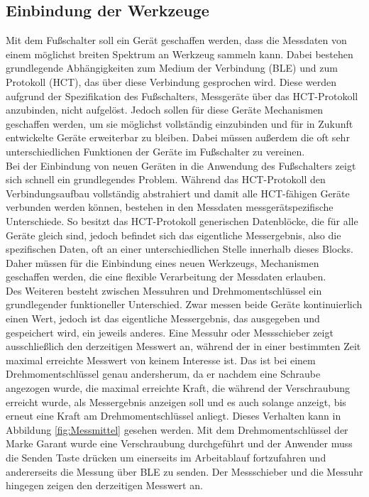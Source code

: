 \subsection{Einbindung der Werkzeuge}
Mit dem Fußschalter soll ein Gerät geschaffen werden, dass die Messdaten von einem möglichst breiten Spektrum an Werkzeug sammeln kann. Dabei bestehen grundlegende Abhängigkeiten zum Medium der Verbindung (\ac{BLE}) und zum Protokoll (\ac{HCT}), das über diese Verbindung gesprochen wird. Diese werden aufgrund der Spezifikation des Fußschalters, Messgeräte über das \ac{HCT}-Protokoll anzubinden, nicht aufgelöst. Jedoch sollen für diese Geräte Mechanismen geschaffen werden, um sie möglichst vollständig einzubinden und für in Zukunft entwickelte Geräte erweiterbar zu bleiben. Dabei müssen außerdem die oft sehr unterschiedlichen Funktionen der Geräte im Fußschalter zu vereinen.\\
Bei der Einbindung von neuen Geräten in die Anwendung des Fußschalters zeigt sich schnell ein grundlegendes Problem. Während das \ac{HCT}-Protokoll den Verbindungsaufbau vollständig abstrahiert und damit alle \ac{HCT}-fähigen Geräte verbunden werden können, bestehen in den Messdaten messgerätspezifische Unterschiede. So besitzt das \ac{HCT}-Protokoll generischen Datenblöcke, die für alle Geräte gleich sind, jedoch befindet sich das eigentliche Messergebnis, also die spezifischen Daten, oft an einer unterschiedlichen Stelle innerhalb dieses Blocks. Daher müssen für die Einbindung eines neuen Werkzeugs, Mechanismen geschaffen werden, die eine flexible Verarbeitung der Messdaten erlauben.\\
Des Weiteren besteht zwischen Messuhren und Drehmomentschlüssel ein grundlegender funktioneller Unterschied. Zwar messen beide Geräte kontinuierlich einen Wert, jedoch ist das eigentliche Messergebnis, das ausgegeben und gespeichert wird, ein jeweils anderes. Eine Messuhr oder Messschieber zeigt ausschließlich den derzeitigen Messwert an, während der in einer bestimmten Zeit maximal erreichte Messwert von keinem Interesse ist. Das ist bei einem Drehmomentschlüssel genau andersherum, da er nachdem eine Schraube angezogen wurde, die maximal erreichte Kraft, die während der Verschraubung erreicht wurde, als Messergebnis anzeigen soll und es auch solange anzeigt, bis erneut eine Kraft am Drehmomentschlüssel anliegt. Dieses Verhalten kann in Abbildung \ref{fig:Messmittel} gesehen werden. Mit dem Drehmomentschlüssel der Marke Garant wurde eine Verschraubung durchgeführt und der Anwender muss die Senden Taste drücken um einerseits im Arbeitablauf fortzufahren und andererseits die Messung über \ac{BLE} zu senden. Der Messschieber und die Messuhr hingegen zeigen den derzeitigen Messwert an.
